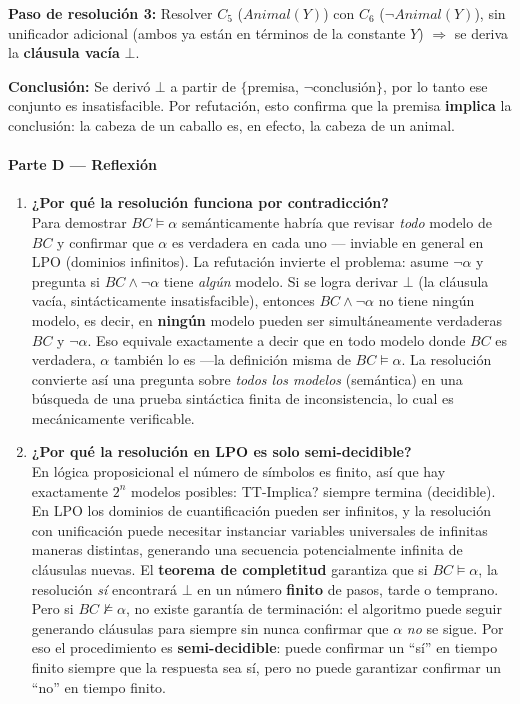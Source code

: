 \textbf{Paso de resolución 3:} Resolver $C_5$ ($Animal(Y)$) con $C_6$ ($\neg Animal(Y)$), sin
unificador adicional (ambos ya están en términos de la constante $Y$) $\Rightarrow$ se deriva la
\textbf{cláusula vacía} $\bot$.

\textbf{Conclusión:} Se derivó $\bot$ a partir de $\{$premisa, $\neg$conclusión$\}$, por lo tanto ese
conjunto es insatisfacible. Por refutación, esto confirma que la premisa \textbf{implica} la
conclusión: la cabeza de un caballo es, en efecto, la cabeza de un animal.

\paragraph{Parte D --- Reflexión}

\begin{enumerate}
    \item[7.] \textbf{¿Por qué la resolución funciona por contradicción?}\\
    Para demostrar $BC \models \alpha$ semánticamente habría que revisar \emph{todo} modelo de $BC$ y
    confirmar que $\alpha$ es verdadera en cada uno — inviable en general en LPO (dominios
    infinitos). La refutación invierte el problema: asume $\neg\alpha$ y pregunta si $BC\land
    \neg\alpha$ tiene \emph{algún} modelo. Si se logra derivar $\bot$ (la cláusula vacía,
    sintácticamente insatisfacible), entonces $BC\land\neg\alpha$ no tiene ningún modelo, es decir,
    en \textbf{ningún} modelo pueden ser simultáneamente verdaderas $BC$ y $\neg\alpha$. Eso equivale
    exactamente a decir que en todo modelo donde $BC$ es verdadera, $\alpha$ también lo es —la
    definición misma de $BC\models\alpha$. La resolución convierte así una pregunta sobre
    \emph{todos los modelos} (semántica) en una búsqueda de una prueba sintáctica finita de
    inconsistencia, lo cual es mecánicamente verificable.

    \item[8.] \textbf{¿Por qué la resolución en LPO es solo semi-decidible?}\\
    En lógica proposicional el número de símbolos es finito, así que hay exactamente $2^n$ modelos
    posibles: TT-Implica? siempre termina (decidible). En LPO los dominios de cuantificación pueden
    ser infinitos, y la resolución con unificación puede necesitar instanciar variables universales
    de infinitas maneras distintas, generando una secuencia potencialmente infinita de cláusulas
    nuevas. El \textbf{teorema de completitud} garantiza que si $BC\models\alpha$, la resolución
    \emph{sí} encontrará $\bot$ en un número \textbf{finito} de pasos, tarde o temprano. Pero si
    $BC\not\models\alpha$, no existe garantía de terminación: el algoritmo puede seguir generando
    cláusulas para siempre sin nunca confirmar que $\alpha$ \emph{no} se sigue. Por eso el
    procedimiento es \textbf{semi-decidible}: puede confirmar un ``sí'' en tiempo finito siempre que
    la respuesta sea sí, pero no puede garantizar confirmar un ``no'' en tiempo finito.
\end{enumerate}


